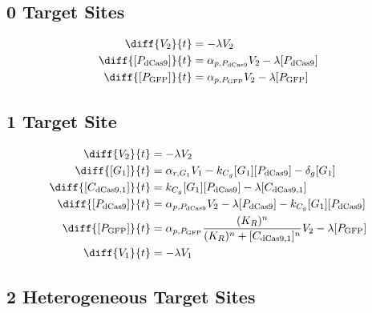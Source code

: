 \subsection{0 Target Sites}
\label{s:No_gRNA_control}

\begin{align}
\diff{\constructGen{2}}{t} & = - \dilutionRate{}\constructGen{2}\\
\diff{\conc{\proSp{\cas{}}}}{t} & =  \txtlRate{\proSp{\cas{}}}\constructGen{2} - \dilutionRate{}\conc{\proSp{\cas{}}}\\
\diff{\conc{\proSp{\gfp}}}{t} & =  \txtlRate{\proSp{\gfp}}\constructGen{2} - \dilutionRate{}\conc{\proSp{\gfp}}
\end{align}

\subsection{1 Target Site}
\label{s:Single_gRNA_repression}

\begin{align}
\diff{\constructGen{2}}{t} & = - \dilutionRate{}\constructGen{2}\\
\diff{\conc{\gRna{1}}}{t} & =  \txRate{\gRna{1}}\constructGen{1} - \gRnaBind{}\conc{\gRna{1}}\conc{\proSp{\cas{}}} - \rnaDegradeRate{}\conc{\gRna{1}}\\
\diff{\conc{\cplx{\cas}{1}}}{t} & =  \gRnaBind{}\conc{\gRna{1}}\conc{\proSp{\cas{}}} - \dilutionRate{}\conc{\cplx{\cas}{1}}\\
\diff{\conc{\proSp{\cas{}}}}{t} & =  \txtlRate{\proSp{\cas{}}}\constructGen{2} - \dilutionRate{}\conc{\proSp{\cas{}}} - \gRnaBind{}\conc{\gRna{1}}\conc{\proSp{\cas{}}}\\
\diff{\conc{\proSp{\gfp}}}{t} & =  \txtlRate{\proSp{\gfp}}\frac{(K_R)^n}{(K_R)^n + \conc{\cplx{\cas}{1}}^n}\constructGen{2} - \dilutionRate{}\conc{\proSp{\gfp}}\\
\diff{\constructGen{1}}{t} & = - \dilutionRate{}\constructGen{1}
\end{align}

\subsection{2 Heterogeneous Target Sites}
\label{s:Multiplexed_2_gRNA_Repression}

